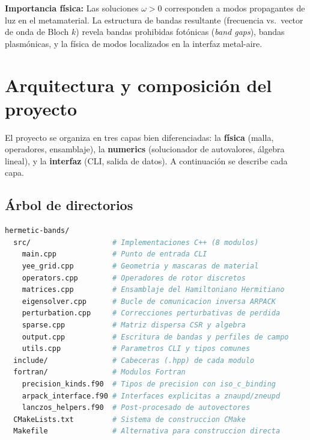 \documentclass[12pt,a4paper]{article}
\begin{document}
\begin{infobox}
    \textbf{Importancia física:} Las soluciones $\omega > 0$ corresponden a modos propagantes de luz en el metamaterial. La estructura de bandas resultante (frecuencia vs.\ vector de onda de Bloch $k$) revela bandas prohibidas fotónicas (\textit{band gaps}), bandas plasmónicas, y la física de modos localizados en la interfaz metal-aire.
\end{infobox}

\section{Arquitectura y composición del proyecto}

El proyecto se organiza en tres capas bien diferenciadas: la \textbf{física} (malla, operadores, ensamblaje), la \textbf{numerics} (solucionador de autovalores, álgebra lineal), y la \textbf{interfaz} (CLI, salida de datos). A continuación se describe cada capa.

\subsection{Árbol de directorios}

\begin{lstlisting}[language=bash, caption={Estructura de archivos del proyecto}]
hermetic-bands/
  src/                   # Implementaciones C++ (8 modulos)
    main.cpp             # Punto de entrada CLI
    yee_grid.cpp         # Geometria y mascaras de material
    operators.cpp        # Operadores de rotor discretos
    matrices.cpp         # Ensamblaje del Hamiltoniano Hermitiano
    eigensolver.cpp      # Bucle de comunicacion inversa ARPACK
    perturbation.cpp     # Correcciones perturbativas de perdida
    sparse.cpp           # Matriz dispersa CSR y algebra
    output.cpp           # Escritura de bandas y perfiles de campo
    utils.cpp            # Parametros CLI y tipos comunes
  include/               # Cabeceras (.hpp) de cada modulo
  fortran/               # Modulos Fortran
    precision_kinds.f90  # Tipos de precision con iso_c_binding
    arpack_interface.f90 # Interfaces explicitas a znaupd/zneupd
    lanczos_helpers.f90  # Post-procesado de autovectores
  CMakeLists.txt         # Sistema de construccion CMake
  Makefile               # Alternativa para construccion directa
\end{lstlisting}
\end{document}

